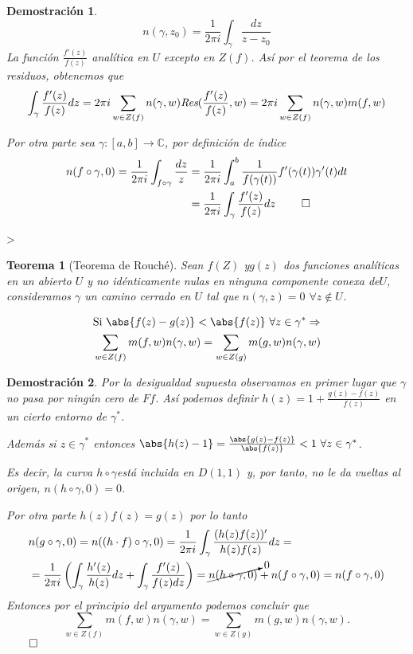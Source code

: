 \documentclass[10pt]{book}
\newtheorem{theorem}{Teorema}[chapter]
\newtheorem*{dem}{Demostración}
\newcommand{\C}{\mathbb{C}}
\newcommand{\Res}{\emph{Res}}
\begin{document}
\begin{dem}
$$n(\gamma,z_0) = \frac{1}{2\pi i}\int_\gamma \frac{dz}{z-z_0}$$
La función $\frac{f'(z)}{f(z)}$ analítica en $U$ excepto en $Z(f)$. Así por el teorema de los residuos, obtenemos que 
$$\int_\gamma \frac{f'(z)}{f(z)} dz = 2\pi i \sum_{w\in Z(f)}n(\gamma,w)\Res(\frac{f'(z)}{f(z)},w) = 2\pi i\sum_{w\in Z(f)}n(\gamma,w)m(f,w)$$

Por otra parte  sea $\gamma:[a,b]\to \C$, por definición de índice
\begin{align*}
n(f\circ \gamma,0) = \frac{1}{2\pi i}\int_{f\circ\gamma}\frac{dz}{z}&= \frac{1}{2\pi i}\int_a^b \frac{1}{f(\gamma(t))}f'(\gamma(t))\gamma'(t)dt \\
&= \frac{1}{2\pi i}\int_\gamma \frac{f'(z)}{f(z)}dz\ \qed
\end{align*}
\end{dem}

>
\begin{theorem}[Teorema de Rouché]
Sean $f(Z)$ y$g(z)$ dos funciones analíticas en un abierto $U$ y no idénticamente nulas en ninguna componente conexa de$U$, consideramos $\gamma$ un camino cerrado en $U$ tal que $n(\gamma,z)=0$ $\forall z\notin U$.

\begin{align*}
&\text{Si }\abs{f(z)-g(z)} < \abs{f(z)}\ \forall z\in\gamma^*\Rightarrow  \\
&\sum_{w\in Z(f)}m(f,w)n(\gamma,w) = \sum_{w\in Z(g)}m(g,w)n(\gamma,w)
\end{align*}
\end{theorem}

\begin{dem}
Por la desigualdad supuesta observamos en primer lugar que $\gamma$ no pasa por ningún cero de $Ff$. Así podemos definir $h(z) = 1 +\frac{g(z)-f(z)}{f(z)}$ en un cierto entorno de $\gamma^*$.

Además si $z\in\gamma^*$ entonces $\abs{h(z)-1} =\frac{\abs{g(z)-f(z)}}{\abs{f(z)}}<1\ \forall z\in\gamma^*$.

Es decir, la curva $h\circ\gamma$está incluida en $D(1,1)$ y, por tanto, no le da vueltas al origen, $n(h\circ\gamma,0)=0$.

Por otra parte $h(z) f(z) = g(z)$ por lo tanto
\begin{align*}
&n(g\circ\gamma,0) = n((h\cdot f)\circ \gamma,0) =\frac{1}{2\pi i}\int_\gamma\frac{(h(z)f(z))'}{h(z)f(z)}dz =\\
&=\frac{1}{2\pi i}\left(\int_\gamma\frac{h'(z)}{h(z)}dz +\int_\gamma \frac{f'(z)}{f(z)dz} \right)= \cancelto{0}{n(h\circ\gamma,0)} + n(f\circ\gamma,0) = n(f\circ\gamma,0)  
\end{align*}
Entonces por el principio del argumento podemos concluir que $$\sum_{w\in Z(f)}m(f,w)n(\gamma,w) = \sum_{w\in Z(g)}m(g,w)n(\gamma,w).$$ $\qed$
\end{dem}
\end{document}
